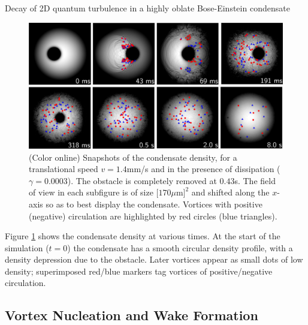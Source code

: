 \begin{chapter}{\label{cha:shin}Decay of 2D quantum turbulence in a highly oblate Bose-Einstein condensate}
\begin{figure}
\centering
\includegraphics[width=0.95\linewidth]{shin/fig2_4x2}
\caption{\label{fig:densSnapshots} (Color online) Snapshots of the condensate density, for a translational speed $v=1.4$mm/s and in the presence of dissipation ($\gamma=0.0003$). The obstacle is completely removed at $0.43$s. The field of view in each subfigure is of size $[170\mu$m$]^2$ and shifted along the $x$-axis so as to best display the condensate.  Vortices with positive (negative) circulation are highlighted by red circles (blue triangles).
}
\end{figure}

Figure \ref{fig:densSnapshots} shows the condensate density at various times. At the start of the simulation ($t=0$) the condensate has a smooth circular density profile, with a density depression due to the obstacle.  Later vortices appear as small dots of low density; superimposed red/blue markers tag vortices of positive/negative circulation.

\subsection{Vortex Nucleation and Wake Formation}


\end{chapter}
